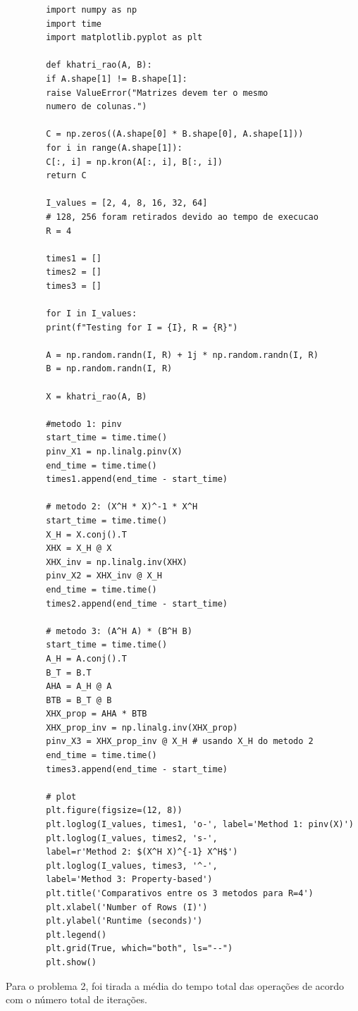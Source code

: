 \documentclass[a4paper, 12pt]{article}
\begin{document}
	\begin{lstlisting}
		import numpy as np
		import time
		import matplotlib.pyplot as plt
		
		def khatri_rao(A, B):
		if A.shape[1] != B.shape[1]:
		raise ValueError("Matrizes devem ter o mesmo 
		numero de colunas.")
		
		C = np.zeros((A.shape[0] * B.shape[0], A.shape[1]))
		for i in range(A.shape[1]):
		C[:, i] = np.kron(A[:, i], B[:, i])
		return C
		
		I_values = [2, 4, 8, 16, 32, 64] 
		# 128, 256 foram retirados devido ao tempo de execucao
		R = 4
		
		times1 = []
		times2 = []
		times3 = []
		
		for I in I_values:
		print(f"Testing for I = {I}, R = {R}")
		
		A = np.random.randn(I, R) + 1j * np.random.randn(I, R)
		B = np.random.randn(I, R)
		
		X = khatri_rao(A, B)
		
		#metodo 1: pinv
		start_time = time.time()
		pinv_X1 = np.linalg.pinv(X)
		end_time = time.time()
		times1.append(end_time - start_time)
		
		# metodo 2: (X^H * X)^-1 * X^H
		start_time = time.time()
		X_H = X.conj().T
		XHX = X_H @ X
		XHX_inv = np.linalg.inv(XHX)
		pinv_X2 = XHX_inv @ X_H
		end_time = time.time()
		times2.append(end_time - start_time)
		
		# metodo 3: (A^H A) * (B^H B)
		start_time = time.time()
		A_H = A.conj().T
		B_T = B.T
		AHA = A_H @ A
		BTB = B_T @ B
		XHX_prop = AHA * BTB
		XHX_prop_inv = np.linalg.inv(XHX_prop)
		pinv_X3 = XHX_prop_inv @ X_H # usando X_H do metodo 2
		end_time = time.time()
		times3.append(end_time - start_time)
		
		# plot
		plt.figure(figsize=(12, 8))
		plt.loglog(I_values, times1, 'o-', label='Method 1: pinv(X)')
		plt.loglog(I_values, times2, 's-', 
		label=r'Method 2: $(X^H X)^{-1} X^H$')
		plt.loglog(I_values, times3, '^-', 
		label='Method 3: Property-based')
		plt.title('Comparativos entre os 3 metodos para R=4')
		plt.xlabel('Number of Rows (I)')
		plt.ylabel('Runtime (seconds)')
		plt.legend()
		plt.grid(True, which="both", ls="--")
		plt.show()
	\end{lstlisting}
	
	Para o problema 2, foi tirada a média do tempo total das operações de acordo com o número total de iterações. 
	
\end{document}
